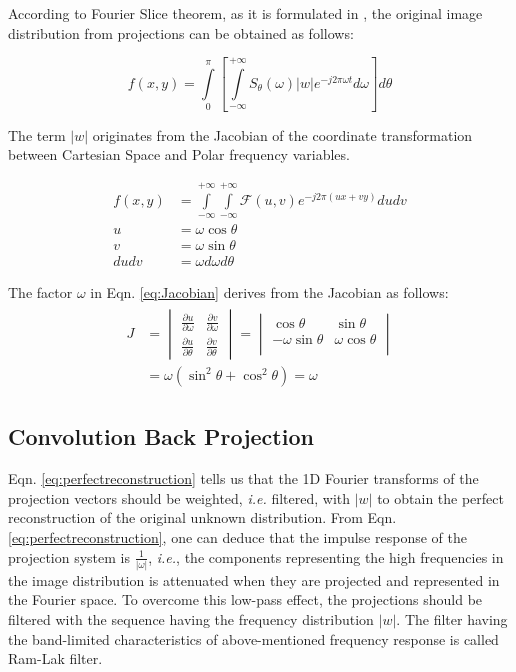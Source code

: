 \documentclass[journal]{IEEEtran}
\begin{document}
According to Fourier Slice theorem, as it is formulated in \cite{kak2001principles}, the original image distribution from projections can be obtained as follows:

\begin{equation}
	f(x,y) = \int\limits_0^\pi\left[\int\limits_{-\infty}^{+\infty}S_{\theta}(\omega)|w|e^{-j2\pi{\omega}t}d\omega\right]d\theta
	\label{eq:perfectreconstruction}
\end{equation}

The term $|w|$ originates from the Jacobian of the coordinate transformation between Cartesian Space and Polar frequency variables. 

\begin{align}
	f(x,y) &= \int\limits_{-\infty}^{+\infty}\int\limits_{-\infty}^{+\infty}\mathcal{F}(u,v)e^{-j2\pi{(ux+vy)}}du{dv} \label{eq:2DFFT} \\
	u &= \omega\cos\theta \\
	v &= \omega\sin\theta \\
	du dv &= \omega d\omega d\theta \label{eq:Jacobian}
\end{align}

The factor $\omega$ in Eqn. \ref{eq:Jacobian} derives from the Jacobian as follows:
\begin{gather}
	\begin{align}
	J &= \begin{vmatrix}
		\frac{\partial u}{\partial \omega} & \frac{\partial v}{\partial \omega} \\ 
		\frac{\partial u}{\partial \theta} & \frac{\partial v}{\partial \theta} 
	\end{vmatrix} = \begin{vmatrix}
		\cos\theta & \sin\theta \\ 
		-\omega\sin\theta & \omega\cos\theta \\
	\end{vmatrix} \\
	&= \omega(\sin^2\theta + \cos^2\theta) = \omega
	\end{align}
\end{gather}

\subsection{Convolution Back Projection}
Eqn. \ref{eq:perfectreconstruction} tells us that the 1D Fourier transforms of the projection vectors should be weighted, \textit{i.e.} filtered, with $|w|$ to obtain the perfect reconstruction of the original unknown distribution. From Eqn. \ref{eq:perfectreconstruction}, one can deduce that the impulse response of the projection system is $\frac{1}{|\omega|}$, \textit{i.e.}, the components representing the high frequencies in the image distribution is attenuated when they are projected and represented in the Fourier space. 
\vfill{\null}
To overcome this low-pass effect, the projections should be filtered with the sequence having the frequency distribution $|w|$. The filter having the band-limited characteristics of above-mentioned frequency response is called Ram-Lak filter.
\end{document}
